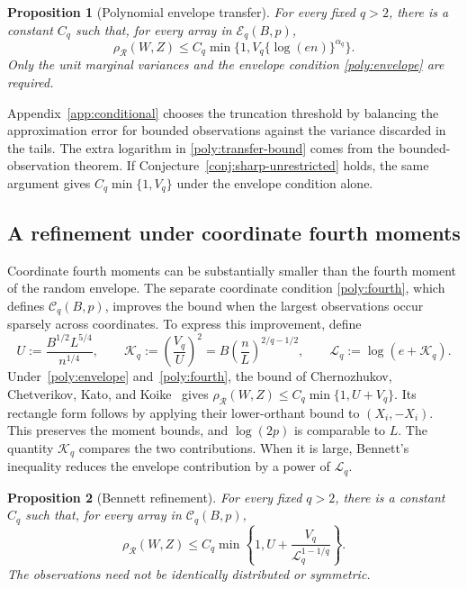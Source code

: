 \documentclass[11pt,letterpaper]{article}
\newtheorem{proposition}{Proposition}
\theoremstyle{remark}
\newcommand{\rh}{\rho_{\mathcal R}}
\begin{document}
\begin{proposition}[Polynomial envelope transfer]\label{poly:transfer}
For every fixed \(q>2\), there is a constant \(C_q\) such that, for
every array in \(\mathcal E_q(B,p)\),
\begin{equation}
 \rh(W,Z)\le C_q\min\{1,V_q\{\log(en)\}^{\alpha_q}\}.
 \label{poly:transfer-bound}
\end{equation}
Only the unit marginal variances and the envelope condition
\eqref{poly:envelope} are required.
\end{proposition}

Appendix~\ref{app:conditional} chooses the truncation threshold by
balancing the approximation error for bounded observations against the
variance discarded in the tails. The extra logarithm in
\eqref{poly:transfer-bound} comes from the bounded-observation theorem.
If Conjecture~\ref{conj:sharp-unrestricted} holds, the same argument
gives \(C_q\min\{1,V_q\}\) under the envelope condition alone.

\subsection{A refinement under coordinate fourth moments}\label{poly:bennett-sec}

Coordinate fourth moments can be substantially smaller than the fourth
moment of the random envelope. The separate coordinate condition
\eqref{poly:fourth}, which defines \(\mathcal C_q(B,p)\), improves
the bound when the largest observations occur sparsely across coordinates.
To express this improvement, define
\begin{equation}
 U:=\frac{B^{1/2}L^{5/4}}{n^{1/4}},\qquad
 \mathcal K_q:=\left(\frac{V_q}{U}\right)^2
     =B\left(\frac nL\right)^{2/q-1/2},\qquad
 \mathcal L_q:=\log(e+\mathcal K_q).
 \label{poly:bennett-parameters}
\end{equation}
Under~\eqref{poly:envelope} and~\eqref{poly:fourth}, the bound of
Chernozhukov, Chetverikov, Kato, and
Koike~\cite[Theorem~2.5]{CCKK2022} gives
\(\rh(W,Z)\le C_q\min\{1,U+V_q\}\).
Its rectangle form follows by applying their lower-orthant bound
to \((X_i,-X_i)\). This preserves the moment bounds, and
\(\log(2p)\) is comparable to \(L\).
The quantity \(\mathcal K_q\) compares the two contributions.
When it is large, Bennett's inequality reduces the envelope
contribution by a power of \(\mathcal L_q\).

\begin{proposition}[Bennett refinement]\label{poly:bennett}
For every fixed \(q>2\), there is a constant \(C_q\) such that, for
every array in \(\mathcal C_q(B,p)\),
\begin{equation}
 \rh(W,Z)\le C_q\min\left\{1,
 U+\frac{V_q}{\mathcal{L}_q^{1-1/q}}\right\}.
 \label{poly:bennett-bound}
\end{equation}
The observations need not be identically distributed or symmetric.
\end{proposition}
\end{document}
